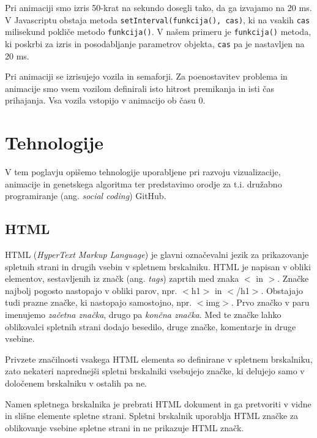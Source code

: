 \documentclass[a4paper, 12pt]{book}
\begin{document}
Pri animaciji smo izris 50-krat na sekundo dosegli tako, da ga izvajamo na 20 ms. V Javascriptu obstaja metoda \verb+setInterval(funkcija(), cas)+, ki na vsakih \verb+cas+ milisekund pokli\v ce metodo \verb+funkcija()+. V na\v sem primeru je \verb+funkcija()+ metoda, ki poskrbi za izris in posodabljanje parametrov objekta, \verb+cas+ pa je nastavljen na 20 ms.

Pri animaciji se izrisujejo vozila in semaforji.  Za poenostavitev problema in  animacije smo vsem vozilom definirali isto hitrost premikanja in isti \v cas prihajanja. Vsa vozila vstopijo v animacijo ob \v casu 0.

\chapter{Tehnologije}
\label{ch3}
V tem poglavju opi\v semo tehnologije uporabljene pri razvoju vizualizacije, animacije in genetskega algoritma ter predstavimo orodje za t.i. dru\v zabno programiranje (ang. \textit{social coding}) GitHub.

\section{HTML}

HTML (\textit{HyperText Markup Language}) je glavni ozna\v cevalni jezik za prikazovanje spletnih strani in drugih vsebin v spletnem brskalniku.
HTML je napisan v obliki elementov, sestavljenih iz zna\v ck (ang. \textit{tags}) zaprtih med znaka $<$ in $>$. Zna\v cke najbolj pogosto nastopajo v obliki parov, npr. $<$h1$>$ in $<$/h1$>$. Obstajajo tudi prazne zna\v cke, ki nastopajo samostojno, npr. $<$img$>$. Prvo zna\v cko v paru imenujemo \textit{za\v cetna zna\v cka}, drugo pa \textit{kon\v cna zna\v cka}. Med te zna\v cke lahko oblikovalci spletnih strani dodajo besedilo, druge zna\v cke, komentarje in druge vsebine.

Privzete zna\v cilnosti vsakega HTML elementa so definirane v spletnem brskalniku, zato nekateri naprednej\v si spletni brskalniki vsebujejo zna\v cke, ki delujejo samo v dolo\v cenem brskalniku v ostalih pa ne.

Namen spletnega brskalnika je prebrati HTML dokument in ga pretvoriti v vidne in sli\v sne elemente spletne strani. Spletni brskalnik uporablja HTML zna\v cke za oblikovanje vsebine spletne strani in ne prikazuje HTML zna\v ck.
\end{document}
